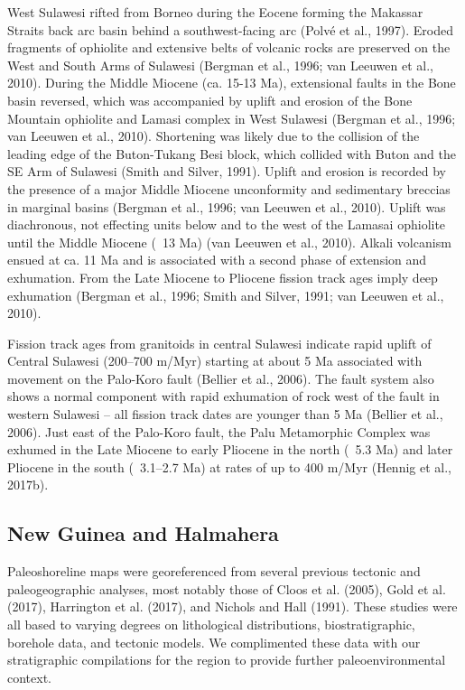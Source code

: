 \documentclass[11pt,letterpaper]{article}
\begin{document}
West Sulawesi rifted from Borneo during the Eocene forming the Makassar Straits back arc basin behind a southwest-facing arc (Polvé et al., 1997). Eroded fragments of ophiolite and extensive belts of volcanic rocks are preserved on the West and South Arms of Sulawesi (Bergman et al., 1996; van Leeuwen et al., 2010). During the Middle Miocene (ca. 15-13 Ma), extensional faults in the Bone basin reversed, which was accompanied by uplift and erosion of the Bone Mountain ophiolite and Lamasi complex in West Sulawesi (Bergman et al., 1996; van Leeuwen et al., 2010). Shortening was likely due to the collision of the leading edge of the Buton-Tukang Besi block, which collided with Buton and the SE Arm of Sulawesi (Smith and Silver, 1991). Uplift and erosion is recorded by the presence of a major Middle Miocene unconformity and sedimentary breccias in marginal basins (Bergman et al., 1996; van Leeuwen et al., 2010). Uplift was diachronous, not effecting units below and to the west of the Lamasai ophiolite until the Middle Miocene (~13 Ma) (van Leeuwen et al., 2010). Alkali volcanism ensued at ca. 11 Ma and is associated with a second phase of extension and exhumation. From the Late Miocene to Pliocene fission track ages imply deep exhumation (Bergman et al., 1996; Smith and Silver, 1991; van Leeuwen et al., 2010).

Fission track ages from granitoids in central Sulawesi indicate rapid uplift of Central Sulawesi (200–700 m/Myr) starting at about 5 Ma associated with movement on the Palo-Koro fault (Bellier et al., 2006). The fault system also shows a normal component with rapid exhumation of rock west of the fault in western Sulawesi – all fission track dates are younger than 5 Ma (Bellier et al., 2006). Just east of the Palo-Koro fault, the Palu Metamorphic Complex was exhumed in the Late Miocene to early Pliocene in the north (~5.3 Ma) and later Pliocene in the south (~3.1–2.7 Ma) at rates of up to 400 m/Myr (Hennig et al., 2017b).

\subsection*{New Guinea and Halmahera}

Paleoshoreline maps were georeferenced from several previous tectonic and paleogeographic analyses, most notably those of Cloos et al. (2005), Gold et al. (2017), Harrington et al. (2017), and Nichols and Hall (1991). These studies were all based to varying degrees on lithological distributions, biostratigraphic, borehole data, and tectonic models. We complimented these data with our stratigraphic compilations for the region to provide further paleoenvironmental context.
\end{document}
